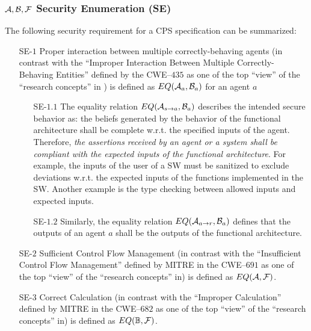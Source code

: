 \subsubsection{$\mathcal{A},\mathcal{B},\mathcal{F}$ Security Enumeration (SE)} The following security requirement for a CPS specification can be summarized:
\begin{enumerate}
	\item[SE-$1$] Proper interaction between multiple correctly-behaving agents (in
		contrast with the ``Improper Interaction Between Multiple
		Correctly-Behaving Entities'' defined by the CWE--$435$ as one of the top ``view'' of the ``research concepts'' in
		\autocite{MITRE2020CWEresearch}) is defined as $EQ(\mathcal{A}_a,\mathcal{B}_a)$ for an agent $a$
	\begin{enumerate}
		\item[SE-$1.1$] The equality relation $EQ(\mathcal{A}_{s\rightarrow a},\mathcal{B}_a)$
			describes the intended secure behavior as: the beliefs generated by the behavior of the functional architecture
			shall be complete w.r.t. the specified inputs of the agent. Therefore, \emph{the assertions received by an agent or a system
			shall be compliant with the expected inputs of the functional architecture}. For example, the inputs
			of the user of a SW must be sanitized to exclude deviations w.r.t. the expected inputs of the functions
			implemented in the SW. Another example is the type checking between allowed inputs and expected inputs.
		\item[SE-$1.2$] Similarly, the equality relation $EQ(\mathcal{A}_{a\rightarrow r},\mathcal{B}_a)$ defines that
			the outputs of an agent $a$ shall be the outputs of the functional architecture.
	\end{enumerate}
	\item[SE-$2$]Sufficient Control Flow Management (in contrast with
		the ``Insufficient Control Flow Management'' defined by MITRE
		in the CWE--$691$ as one of the top ``view'' of the ``research
		concepts'' in\autocite{MITRE2020CWEresearch}) is defined as
		$EQ(\mathcal{A},\mathcal{F})$.
	\item[SE-$3$] Correct Calculation (in contrast with the ``Improper
		Calculation'' defined by MITRE in the CWE--$682$ as one of the
		top ``view'' of the ``research concepts''
		in\autocite{MITRE2020CWEresearch}) is defined as
		$EQ(\mathbb{B},\mathcal{F})$.
\end{enumerate}

